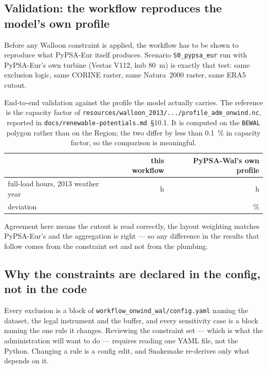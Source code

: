\documentclass[11pt,a4paper]{article}
\begin{document}
\subsection{Validation: the workflow reproduces the model's own profile}
\label{sec:validation}

Before any Walloon constraint is applied, the workflow has to be shown to
reproduce what PyPSA-Eur itself produces. Scenario \texttt{S0\_pypsa\_eur} run
with PyPSA-Eur's own turbine (Vestas V112, hub \SI{80}{\metre}) is exactly that
test: same exclusion logic, same CORINE raster, same Natura~2000 raster, same
ERA5 cutout.

\begin{table}[htbp]\centering\small
\caption{End-to-end validation against the profile the model actually carries.
The reference is the capacity factor of
\texttt{resources/walloon\_2013/.../profile\_adm\_onwind.nc}, reported in
\texttt{docs/renewable-potentials.md}~§10.1. It is computed on the
\texttt{BEWAL} polygon rather than on the Region; the two differ by less than
\SI{0.1}{\percent} in capacity factor, so the comparison is meaningful.}
\label{tab:validation}
\begin{tabular}{lrr}
\toprule
 & this workflow & PyPSA-Wal's own profile \\
\midrule
full-load hours, 2013 weather year & \ValFlh{}~h & \ValRefFlh{}~h \\
deviation & \multicolumn{2}{r}{\ValDelta{}\,\%} \\
\bottomrule
\end{tabular}
\end{table}

Agreement here means the cutout is read correctly, the layout weighting matches
PyPSA-Eur's and the aggregation is right --- so any difference in the results
that follow comes from the constraint set and not from the plumbing.

\subsection{Why the constraints are declared in the config, not in the code}

Every exclusion is a block of \texttt{workflow\_onwind\_wal/config.yaml} naming
the dataset, the legal instrument and the buffer, and every sensitivity case is
a block naming the one rule it changes. Reviewing the constraint set --- which
is what the administration will want to do --- requires reading one YAML file,
not the Python. Changing a rule is a config edit, and Snakemake re-derives only
what depends on it.
\end{document}
